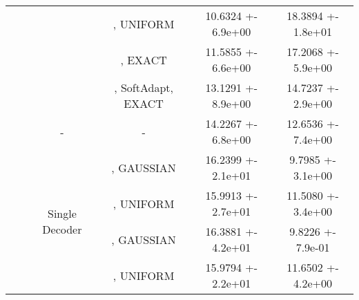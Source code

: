 \begin{center}
\begin{table}
\begin{tabular}{||c|c|c|c|c|c||}
\cline{4-6}
 &  &  & , UNIFORM & 10.6324 +- 6.9e+00 & 18.3894 +- 1.8e+01 \\
\cline{4-6}
 &  &  & , EXACT & 11.5855 +- 6.6e+00 & 17.2068 +- 5.9e+00 \\
\cline{4-6}
 &  &  & , SoftAdapt, EXACT & 13.1291 +- 8.9e+00 & 14.7237 +- 2.9e+00 \\
\cline{4-6}
\cline{3-6}
 &  & \multirow{1}{*}{-} & - & 14.2267 +- 6.8e+00 & 12.6536 +- 7.4e+00 \\
\cline{4-6}
\cline{3-6}
 &  & \multirow{4}{*}{Single Decoder} & , GAUSSIAN & 16.2399 +- 2.1e+01 & 9.7985 +- 3.1e+00 \\
\cline{4-6}
 &  &  & , UNIFORM & 15.9913 +- 2.7e+01 & 11.5080 +- 3.4e+00 \\
\cline{4-6}
 &  &  & , GAUSSIAN & 16.3881 +- 4.2e+01 & 9.8226 +- 7.9e-01 \\
\cline{4-6}
 &  &  & , UNIFORM & 15.9794 +- 2.2e+01 & 11.6502 +- 4.2e+00 \\
\cline{4-6}
\cline{3-6}
\cline{2-6}
\hline
\hline
\end{tabular}
\end{table}
\end{center}
